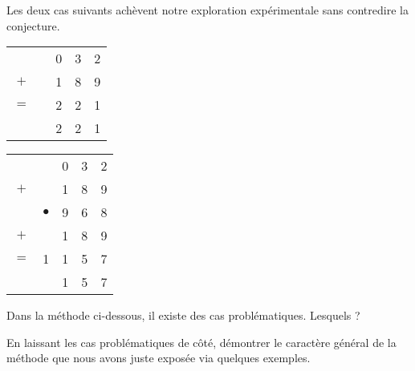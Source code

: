 Les deux cas suivants achèvent notre exploration expérimentale sans contredire la conjecture.
\begin{multicols}{2}
\begin{center}
\begin{tabular}{ccccc}
	    &          & 0 & 3 & 2 \\
	$+$ &          & 1 & 8 & 9 \\
	\hline
	$=$ &          & 2 & 2 & 1 \\
	\hline
	\hline
        & \sign{+} & 2 & 2 & 1 \\
\end{tabular}
\end{center}

\null\vfill

\columnbreak

\begin{center}
\begin{tabular}{ccccc}
	    & \sign{-}  & 0 & 3 & 2 \\
	$+$ &           & 1 & 8 & 9 \\
	\hline
	\hline
	    & $\bullet$ & 9 & 6 & 8 \\
	$+$ &           & 1 & 8 & 9 \\
	\hline
	$=$ & 1         & 1 & 5 & 7 \\
	\hline
	\hline
        & \sign{+}  & 1 & 5 & 7 \\
\end{tabular}
\end{center}
\end{multicols}


\begin{exercise}
	Dans la méthode ci-dessous, il existe des cas problématiques. Lesquels ?
\end{exercise}


\begin{exercise}
	En laissant les cas problématiques de côté, démontrer le caractère général de la méthode que nous avons juste exposée via quelques exemples.
\end{exercise}

